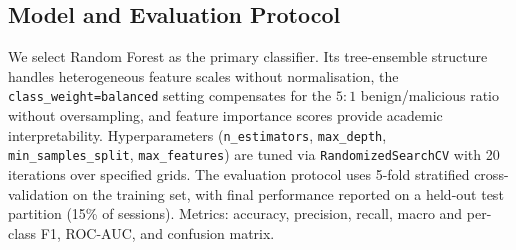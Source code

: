 \subsection{Model and Evaluation Protocol}

We select Random Forest \cite{breiman2001} as the primary classifier. Its tree-ensemble
structure handles heterogeneous feature scales without normalisation, the
\texttt{class\_weight=balanced} setting compensates for the $5:1$ benign/malicious ratio
without oversampling, and feature importance scores provide academic interpretability.
Hyperparameters (\texttt{n\_estimators}, \texttt{max\_depth}, \texttt{min\_samples\_split},
\texttt{max\_features}) are tuned via \texttt{RandomizedSearchCV} with 20 iterations over
specified grids. The evaluation protocol uses 5-fold stratified cross-validation on the
training set, with final performance reported on a held-out test partition (15\% of
sessions). Metrics: accuracy, precision, recall, macro and per-class F1, ROC-AUC, and
confusion matrix.
